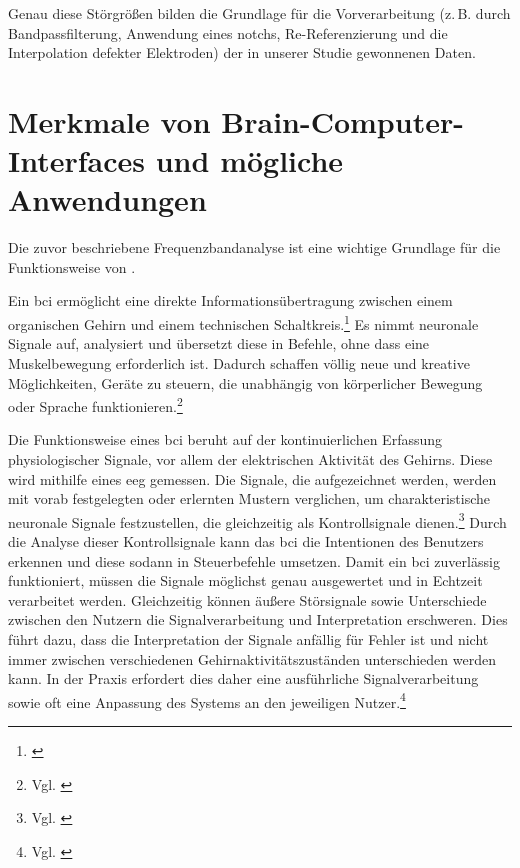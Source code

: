 Genau diese Störgrößen bilden die Grundlage für die Vorverarbeitung (z.\,B. durch Bandpassfilterung, Anwendung eines \gls{notch}s, Re-Referenzierung und die Interpolation defekter Elektroden) der in unserer Studie gewonnenen Daten. 

\section{Merkmale von Brain-Computer-Interfaces und mögliche Anwendungen}
\label{sec:bci}

Die zuvor beschriebene Frequenzbandanalyse ist eine wichtige Grundlage für die Funktionsweise von .

Ein \acrshort{bci} ermöglicht \glqq eine direkte Informationsübertragung zwischen einem organischen Gehirn und einem technischen Schaltkreis\grqq{}.\footnote{\cite{heuer2015}}
Es nimmt neuronale Signale auf, analysiert und übersetzt diese in Befehle, ohne dass eine Muskelbewegung erforderlich ist.
Dadurch schaffen  völlig neue und kreative Möglichkeiten, Geräte zu steuern, die unabhängig von körperlicher Bewegung oder Sprache funktionieren.\footnote{Vgl. \cite{heuer2015}}

Die Funktionsweise eines \acrshort{bci} beruht auf der kontinuierlichen Erfassung physiologischer Signale, vor allem der elektrischen Aktivität des Gehirns.
Diese wird mithilfe eines \acrshort{eeg} gemessen.
Die Signale, die aufgezeichnet werden, werden mit vorab festgelegten oder erlernten Mustern verglichen, um charakteristische neuronale Signale festzustellen, die gleichzeitig als Kontrollsignale dienen.\footnote{Vgl. \cite{heuer2015}}
Durch die Analyse dieser Kontrollsignale kann das \acrshort{bci} die Intentionen des Benutzers erkennen und diese sodann in Steuerbefehle umsetzen.
Damit ein \acrshort{bci} zuverlässig funktioniert, müssen die Signale möglichst genau ausgewertet und in Echtzeit verarbeitet werden.
Gleichzeitig können äußere Störsignale sowie Unterschiede zwischen den Nutzern die Signalverarbeitung und Interpretation erschweren.
Dies führt dazu, dass die Interpretation der Signale anfällig für Fehler ist und nicht immer zwischen verschiedenen Gehirnaktivitätszuständen unterschieden werden kann.
In der Praxis erfordert dies daher eine ausführliche Signalverarbeitung sowie oft eine Anpassung des Systems an den jeweiligen Nutzer.\footnote{Vgl. \cite[S.~772]{wolpaw2002}}

